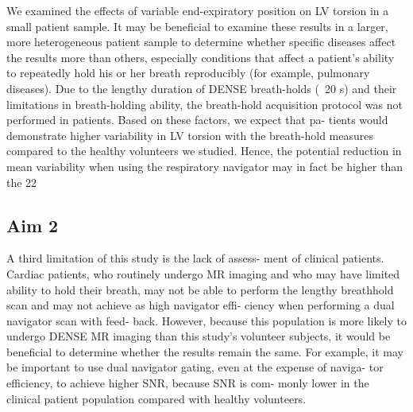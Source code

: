 	We examined the effects of variable end-expiratory position on LV torsion in a small patient sample. It may be beneficial to examine these results in a larger, more heterogeneous patient sample to determine whether specific diseases affect the results more than others, especially conditions that affect a patient’s ability to repeatedly hold his or her breath reproducibly (for example, pulmonary diseases). Due to the lengthy duration of DENSE breath-holds
	(~20 s) and their limitations in breath-holding ability, the breath-hold acquisition protocol was not performed in patients. Based on these factors, we expect that pa- tients would demonstrate higher variability in LV torsion with the breath-hold measures compared to the healthy volunteers we studied. Hence, the potential reduction in mean variability when using the respiratory navigator may in fact be higher than the 22%


\subsection{Aim 2}
	A third limitation of this study is the lack of assess-
	ment of clinical patients. Cardiac patients, who routinely undergo MR imaging and who may have limited ability to hold their breath, may not be able to perform the lengthy breathhold scan and may not achieve as high navigator effi- ciency when performing a dual navigator scan with feed- back. However, because this population is more likely to undergo DENSE MR imaging than this study’s volunteer subjects, it would be beneficial to determine whether the results remain the same. For example, it may be important to use dual navigator gating, even at the expense of naviga- tor efficiency, to achieve higher SNR, because SNR is com- monly lower in the clinical patient population compared with healthy volunteers.

